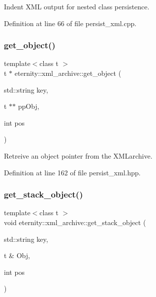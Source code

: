 Indent X\+ML output for nested class persistence. 



Definition at line 66 of file persist\+\_\+xml.\+cpp.

\mbox{\label{classeternity_1_1xml__archive_abc5b89e39007323cefb8855492795631}} 
\subsubsection{\texorpdfstring{get\+\_\+object()}{get\_object()}}
{\footnotesize\ttfamily template$<$class t $>$ \\
t $\ast$ eternity\+::xml\+\_\+archive\+::get\+\_\+object (\begin{DoxyParamCaption}\item[{std\+::string}]{key,  }\item[{t $\ast$$\ast$}]{pp\+Obj,  }\item[{int}]{pos }\end{DoxyParamCaption})}



Retreive an object pointer from the X\+M\+Larchive. 



Definition at line 162 of file persist\+\_\+xml.\+hpp.

\mbox{\label{classeternity_1_1xml__archive_a8b43bda52a9429f6b4d6e4501f42fe60}} 
\subsubsection{\texorpdfstring{get\+\_\+stack\+\_\+object()}{get\_stack\_object()}}
{\footnotesize\ttfamily template$<$class t $>$ \\
void eternity\+::xml\+\_\+archive\+::get\+\_\+stack\+\_\+object (\begin{DoxyParamCaption}\item[{std\+::string}]{key,  }\item[{t \&}]{Obj,  }\item[{int}]{pos }\end{DoxyParamCaption})}




